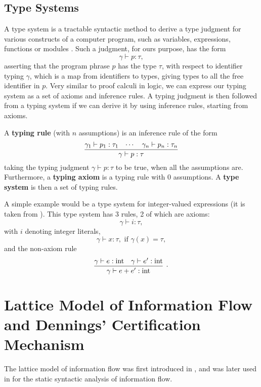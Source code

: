 \documentclass{llncs}
\newcommand{\lit}[1]{\mathrm{#1}}
\begin{document}
\subsection{Type Systems}

A type system is a tractable syntactic method to derive a type judgment for  various constructs of a computer program, such as variables, expressions, functions or modules \cite{Pierce2002}. Such a judgment, for ours purpose, has the form
\[
\gamma \vdash p : \tau,
\]
asserting that the program phrase $p$ has the type $\tau$, with respect to identifier typing $\gamma$, which is a map from identifiers to types, giving types to all the free identifier in $p$. Very similar to proof calculi in logic, we can express our typing system as a set of axioms and inference rules. A typing judgment is then followed from a typing system if we can derive it by using inference rules, starting from axioms.

\begin{definition}
A \textbf{typing rule} (with $n$ assumptions) is an inference rule of the form
\[
\infer{\gamma \vdash p : \tau}{
    \gamma_1 \vdash p_1 : \tau_1
    &
    \cdots
    &
    \gamma_n \vdash p_n : \tau_n
}
\]
taking the typing judgment $\gamma \vdash p : \tau$ to be true, when all the assumptions are. Furthermore, a \textbf{typing axiom} is a typing rule with 0 assumptions. A \textbf{type system} is then a set of typing rules.
\end{definition}

\begin{example}
A simple example would be a type system for integer-valued expressions (it is taken from \cite{VolpanoIS96}).
This type system has 3 rules, 2 of which are axioms:
\[
\gamma \vdash i : \tau,
\]
with $i$ denoting integer literals,
\[
\gamma \vdash x : \tau, \mbox{ if } \gamma(x) = \tau,
\]
and the non-axiom rule
\[
\infer[.]{\gamma \vdash e + e' : \lit{int}}{
    \gamma \vdash e : \lit{int}
    &
    \gamma \vdash e' : \lit{int}
}
\]
\end{example}

\section{Lattice Model of Information Flow and Dennings' Certification Mechanism}

The lattice model of information flow was first introduced in \cite{Denning76}, and was later used in \cite{Denning77} for the static syntactic analysis of information flow.
\end{document}
